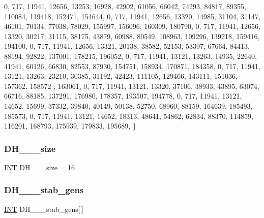 \begin{DoxyCode}
    0, 717, 11941, 12656, 13253, 16928, 42902, 61056, 66042, 74293, 84817, 89355, 110084, 119418, 152471, 
      154644, 
    0, 717, 11941, 12656, 13320, 14985, 31104, 31147, 46101, 70134, 77038, 78029, 155997, 156096, 160309, 
      180790, 
    0, 717, 11941, 12656, 13320, 30217, 31115, 38175, 43879, 60988, 80549, 108963, 109296, 139218, 159416, 
      194100, 
    0, 717, 11941, 12656, 13321, 20138, 38582, 52153, 53397, 67664, 84413, 88194, 92822, 137001, 178215, 
      196052, 
    0, 717, 11941, 13121, 13263, 14935, 22640, 41941, 60126, 66830, 82553, 87930, 154751, 158934, 170871, 
      184358, 
    0, 717, 11941, 13121, 13263, 23210, 30385, 31192, 42423, 111105, 129466, 143111, 151036, 157362, 158572
      , 163061, 
    0, 717, 11941, 13121, 13320, 37106, 38933, 43895, 63074, 66716, 88185, 137291, 176980, 178357, 193507, 
      194778, 
    0, 717, 11941, 13121, 14652, 15699, 37332, 39840, 40149, 50138, 52750, 68960, 88159, 164639, 185493, 
      185573, 
    0, 717, 11941, 13121, 14652, 18313, 48641, 54862, 62834, 88370, 114859, 116201, 168793, 175939, 179833,
       195689, 
\}
\end{DoxyCode}
\mbox{\label{data___d_h_8_c_acc9f695e62f210df7664d2023d09e577}} 
\subsubsection{\texorpdfstring{D\+H\+\_\+\_\+\_\+size}{DH\_4\_8\_size}}
{\footnotesize\ttfamily \mbox{\hyperlink{galois_8h_a09fddde158a3a20bd2dcadb609de11dc}{I\+NT}} D\+H\+\_\+\_\+\_\+size = 16}

\mbox{\label{data___d_h_8_c_aea149ef4b6e6e36f0ea6fd11c64d5892}} 
\subsubsection{\texorpdfstring{D\+H\+\_\+\_\+\_\+stab\+\_\+gens}{DH\_4\_8\_stab\_gens}}
{\footnotesize\ttfamily \mbox{\hyperlink{galois_8h_a09fddde158a3a20bd2dcadb609de11dc}{I\+NT}} D\+H\+\_\+\_\+\_\+stab\+\_\+gens\mbox{[}$\,$\mbox{]}}

